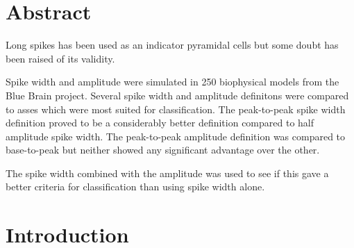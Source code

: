 \documentclass[altfont, fleqn]{uiophd}
\begin{document}
\chapter*{Abstract}
\noindent

Long spikes has been used as an indicator 
pyramidal cells but some doubt has been raised of its validity. 

Spike width and amplitude were simulated in 250 biophysical models
from the Blue Brain project. 
Several spike width and amplitude definitons were compared to 
asses which were most suited for classification. 
The peak-to-peak spike width definition proved to be a considerably 
better definition compared to half amplitude spike width. 
The peak-to-peak amplitude definition was compared to base-to-peak 
but neither showed any significant advantage over the other. 

The spike width combined with the amplitude was
used to see if this gave a better criteria for
classification than
using spike width alone.


\setcounter{tocdepth}{1}
\startcontents
\tableofcontents
\chapter{Introduction}



\end{document}
